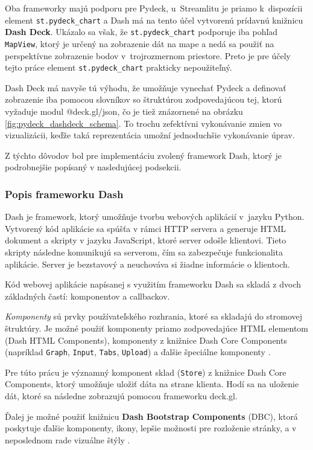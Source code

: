 Oba frameworky majú podporu pre Pydeck, u~Streamlitu je priamo k~dispozícii element \texttt{st.pydeck\_chart} a Dash má na tento účel vytvorenú prídavnú knižnicu \textbf{Dash Deck}. Ukázalo sa však, že \texttt{st.pydeck\_chart} podporuje iba pohľad \texttt{MapView}, ktorý je určený na zobrazenie dát na mape a nedá sa použiť na perspektívne zobrazenie bodov v~trojrozmernom priestore. Preto je pre účely tejto práce element \texttt{st.pydeck\_chart} prakticky nepoužiteľný.

Dash Deck má navyše tú výhodu, že umožňuje vynechať Pydeck a definovať zobrazenie iba pomocou slovníkov so štruktúrou zodpovedajúcou tej, ktorú vyžaduje modul @deck.gl/json, čo je tiež znázornené na obrázku \ref{fig:pydeck_dashdeck_schema}. To trochu zefektívni vykonávanie zmien vo vizualizácii, keďže taká reprezentácia umožní jednoduchšie vykonávanie úprav.

Z týchto dôvodov bol pre implementáciu zvolený framework Dash, ktorý je podrobnejšie popísaný v nasledujúcej podsekcii.

\subsubsection{Popis frameworku Dash}

Dash je framework, ktorý umožňuje tvorbu webových aplikácií v~jazyku Python. Vytvorený kód aplikácie sa spúšťa v rámci HTTP servera a generuje HTML dokument a skripty v jazyku JavaScript, ktoré server odošle klientovi. Tieto skripty následne komunikujú sa serverom, čím sa zabezpečuje funkcionalita aplikácie. Server je bezstavový a neuchováva si žiadne informácie o klientoch.

Kód webovej aplikácie napísanej s využitím frameworku Dash sa skladá z dvoch základných častí: komponentov a callbackov.

\emph{Komponenty} sú prvky používateľského rozhrania, ktoré sa skladajú do stromovej štruktúry. Je možné použiť komponenty priamo zodpovedajúce HTML elementom (Dash HTML Components), komponenty z knižnice Dash Core Components (napríklad \texttt{Graph}, \texttt{Input}, \texttt{Tabs}, \texttt{Upload}) a ďalšie špeciálne komponenty \cite{dash_documentation}.

Pre túto prácu je významný komponent sklad (\texttt{Store}) z knižnice Dash Core Components, ktorý umožňuje uložiť dáta na strane klienta. Hodí sa na uloženie dát, ktoré sa následne zobrazujú pomocou frameworku deck.gl.

Ďalej je možné použiť knižnicu \textbf{Dash Bootstrap Components} (DBC), ktorá poskytuje ďalšie komponenty, ikony, lepšie možnosti pre rozloženie stránky, a v neposlednom rade vizuálne štýly \cite{dbc_documentation}.

